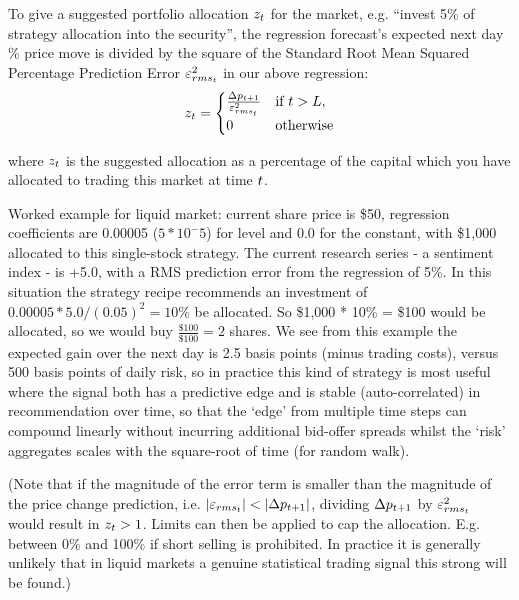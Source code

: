 \documentclass{article}%
\begin{document}
{\vspace{1mm}
\justify To give a suggested portfolio allocation $z_t$ for the market, e.g. ``invest 5\% of strategy allocation into the security'', the regression forecast's expected next day \% price move is divided by the square of the Standard Root Mean Squared Percentage Prediction Error $\varepsilon^{{2}}_{rms_{t}}$ in our above regression:
\vspace{1mm}
\\



\vspace{1mm}
\begin{equation}
    z_t = 
    \begin{cases}
    \frac{\Delta p_{t+1}}{\varepsilon^{{2}}_{rms_{t}}} & \text{if } t > L,\\
    0                                        & \text{otherwise}
    \end{cases}
\end{equation}



\vspace{1mm}
\justify where $z_t$ is the suggested allocation as a percentage of the capital which you have allocated to trading this market at time $t$.

\justify Worked example for liquid market:  current share price is \$50, regression coefficients are 0.00005 ($5 * 10^-5$) for level and 0.0 for the constant, with \$1,000 allocated to this single-stock strategy.  The current research series - a sentiment index - is +5.0, with a RMS prediction error from the regression of 5\%. In this situation the strategy recipe recommends an investment of $0.00005 * 5.0 / (0.05)^2 = 10\%$ be allocated. So \$1,000 * 10\% = \$100 would be allocated, so we would buy $\frac{\$100}{\$100} = 2$ shares.
We see from this example the expected gain over the next day is 2.5 basis points (minus trading costs), versus 500 basis points of daily risk, so in practice this kind of strategy is most useful where the signal both has a predictive edge and is stable (auto-correlated) in recommendation over time, so that the `edge' from multiple time steps can compound linearly without incurring additional bid-offer spreads whilst the `risk' aggregates scales with the square-root of time (for random walk).


\vspace{1mm}
\justify (Note that if the magnitude of the error term is smaller than the magnitude of the price change prediction, i.e. $|\varepsilon_{rms_{t}}| < |\Delta p_{t+1}|$, dividing $\Delta p_{t+1}$ by $\varepsilon^{{2}}_{rms_{t}}$ would result in $z_t>1$. Limits can then be applied to cap the allocation. E.g. between 0\% and 100\% if short selling is prohibited. In practice it is generally unlikely that in liquid markets a genuine statistical trading signal this strong will be found.)

}
\end{document}
